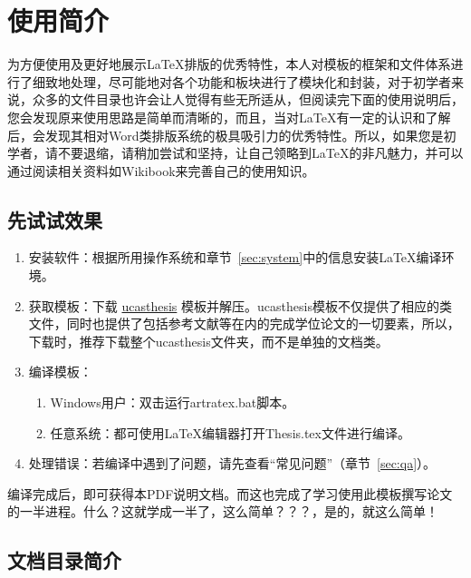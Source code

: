 
\chapter{使用简介}
\label{chap:guide}

为方便使用及更好地展示\LaTeX{}排版的优秀特性，本人对模板的框架和文件体系进行了细致地处理，尽可能地对各个功能和板块进行了模块化和封装，对于初学者来说，众多的文件目录也许会让人觉得有些无所适从，但阅读完下面的使用说明后，您会发现原来使用思路是简单而清晰的，而且，当对\LaTeX{}有一定的认识和了解后，会发现其相对Word类排版系统的极具吸引力的优秀特性。所以，如果您是初学者，请不要退缩，请稍加尝试和坚持，让自己领略到\LaTeX{}的非凡魅力，并可以通过阅读相关资料如Wikibook\citep{wikibook2014latex}来完善自己的使用知识。

\section{先试试效果}

\begin{enumerate}
    \item 安装软件：根据所用操作系统和章节~\ref{sec:system}中的信息安装\LaTeX{}编译环境。
    \item 获取模板：下载 \href{https://github.com/mohuangrui/ucasthesis}{ucasthesis} 模板并解压。ucasthesis模板不仅提供了相应的类文件，同时也提供了包括参考文献等在内的完成学位论文的一切要素，所以，下载时，推荐下载整个ucasthesis文件夹，而不是单独的文档类。
    \item 编译模板：
        \begin{enumerate}
            \item Windows用户：双击运行artratex.bat脚本。
            \item 任意系统：都可使用\LaTeX{}编辑器打开Thesis.tex文件进行编译。
        \end{enumerate}
    \item 处理错误：若编译中遇到了问题，请先查看“常见问题”（章节~\ref{sec:qa}）。
\end{enumerate}

编译完成后，即可获得本PDF说明文档。而这也完成了学习使用此模板撰写论文的一半进程。什么？这就学成一半了，这么简单？？？，是的，就这么简单！

\section{文档目录简介}

